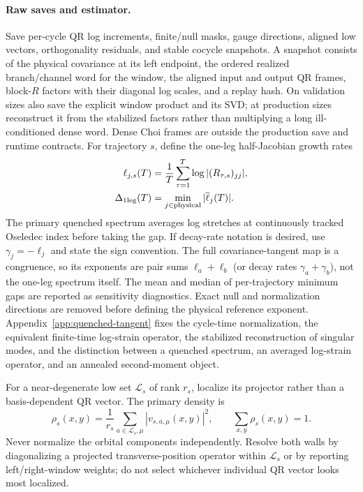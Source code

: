 \documentclass[aps,prx,twocolumn,floatfix,nofootinbib,superscriptaddress,longbibliography]{revtex4-2}
\begin{document}
\paragraph*{Raw saves and estimator.}
Save per-cycle QR log increments, finite/null masks, gauge directions, aligned low vectors,
orthogonality residuals, and stable cocycle snapshots.  A snapshot consists of the physical
covariance at its left endpoint, the ordered realized branch/channel word for the window,
the aligned input and output QR frames, block-$R$ factors with their diagonal log scales,
and a replay hash.  On validation sizes also save the explicit window product and its SVD;
at production sizes reconstruct it from the stabilized factors rather than multiplying a
long ill-conditioned dense word.  Dense Choi frames are outside the production save and
runtime contracts.  For trajectory $s$, define the
one-leg half-Jacobian growth rates
\begin{equation}
 \begin{aligned}
 \ell_{j,s}(T)&=\frac1T\sum_{\tau=1}^{T}\log |(R_{\tau,s})_{jj}|,\\
 \Delta_{\rm 1leg}(T)&=\min_{j\in\mathrm{physical}}|\overline\ell_j(T)|.
 \end{aligned}
 \label{eq:one-leg-growth-rates}
\end{equation}
The primary quenched spectrum averages log stretches at continuously tracked Oseledec
index before taking the gap.  If decay-rate notation is desired, use
$\gamma_j=-\ell_j$ and state the sign convention.  The full covariance-tangent map is a
congruence, so its exponents are pair sums $\ell_a+\ell_b$ (or decay rates
$\gamma_a+\gamma_b$), not the one-leg spectrum itself.  The mean and median of
per-trajectory minimum gaps are reported as sensitivity diagnostics.  Exact null and
normalization directions are removed before defining the physical reference exponent.
Appendix~\ref{app:quenched-tangent} fixes the cycle-time normalization, the equivalent
finite-time log-strain operator, the stabilized reconstruction of singular modes, and the
distinction between a quenched spectrum, an averaged log-strain operator, and an annealed
second-moment object.

For a near-degenerate low set $\mathcal L_s$ of rank $r_s$, localize its projector rather
than a basis-dependent QR vector.  The primary density is
\begin{equation}
 \rho_s(x,y)=\frac1{r_s}\sum_{a\in\mathcal L_s,\mu}
 |v_{s,a,\mu}(x,y)|^2,
 \qquad \sum_{x,y}\rho_s(x,y)=1.
\end{equation}
Never normalize the orbital components independently.  Resolve both walls by diagonalizing
a projected transverse-position operator within $\mathcal L_s$ or by reporting
left/right-window weights; do not select whichever individual QR vector looks most
localized.
\end{document}
